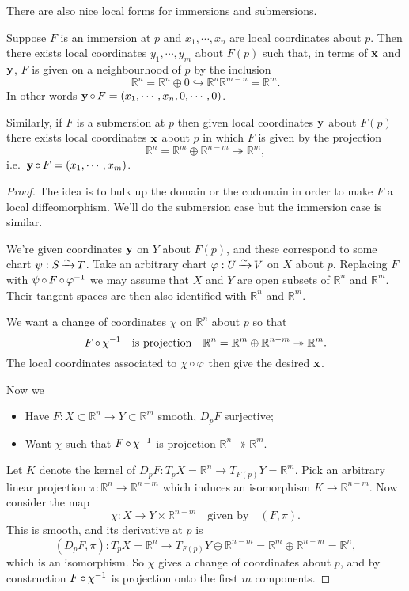 \documentclass[a4paper,11pt]{article}
\begin{document}
	There are also nice local forms for immersions and submersions.

	\begin{lem}
		Suppose $F$ is an immersion at $p$ and $x_1, \cdots, x_n$ are local coordinates about $p$. Then there exists local coordinates $y_1, \cdots, y_m$ about $F(p)$ such that, in terms of $\vb x$ and $\vb y$, $F$ is given on a neighbourhood of $p$ by the inclusion
		\[
			\mathbb{R}^n = \mathbb{R}^n \oplus 0 \hookrightarrow \mathbb{R}^n \mathbb{R}^{m-n} = \mathbb{R}^m.
		\]
		In other words $\vb y \operatorname{\circ} F = (x_1, \cdots, x_n, 0, \cdots, 0)$.

		Similarly, if $F$ is a submersion at $p$ then given local coordinates $\vb y$ about $F(p)$ there exists local coordinates $\vb x$ about $p$ in which $F$ is given by the projection
		\[
			\mathbb{R}^n = \mathbb{R}^m \oplus \mathbb{R}^{n-m} \twoheadrightarrow \mathbb{R}^m,
		\]
		i.e.\ $\vb y \operatorname{\circ} F = (x_1, \cdots, x_m)$.
	\end{lem}
	\begin{proof}
		The idea is to bulk up the domain or the codomain in order to make $F$ a local diffeomorphism. We'll do the submersion case but the immersion case is similar.

		We're given coordinates $\vb y$ on $Y$ about $F(p)$, and these correspond to some chart $\psi : S \operatorname{\xrightarrow{\sim}} T$. Take an arbitrary chart $\varphi : U \operatorname{\xrightarrow{\sim}} V$ on $X$ about $p$. Replacing $F$ with $\psi \operatorname{\circ} F \operatorname{\circ} \varphi^{-1}$ we may assume that $X$ and $Y$ are open subsets of $\mathbb{R}^n$ and $\mathbb{R}^m$. Their tangent spaces are then also identified with $\mathbb{R}^n$ and $\mathbb{R}^m$.

		We want a change of coordinates $\chi$ on $\mathbb{R}^n$ about $p$ so that
		\[
			F \operatorname{\circ} \chi^{-1} \quad \text{is projection} \quad \mathbb{R}^n = \mathbb{R}^m \oplus \mathbb{R}^{n-m} \twoheadrightarrow \mathbb{R}^m.
		\]
		The local coordinates associated to $\chi \operatorname{\circ} \varphi$ then give the desired $\vb x$.

		Now we
		\begin{itemize}
			\item Have $F : X \subset \mathbb{R}^n \to Y \subset \mathbb{R}^m$ smooth, $D_p F$ surjective;
			\item Want $\chi$ such that $F \operatorname{\circ} \chi^{-1}$ is projection $\mathbb{R}^n \twoheadrightarrow \mathbb{R}^m$.
		\end{itemize}

		Let $K$ denote the kernel of $D_p F : T_p X = \mathbb{R}^n \to T _{F(p)} Y = \mathbb{R}^m$. Pick an arbitrary linear projection $\pi : \mathbb{R}^n \to \mathbb{R}^{n-m}$ which induces an isomorphism $K \to \mathbb{R}^{n-m}$. Now consider the map
		\[
			\chi : X \to Y \times \mathbb{R}^{n-m} \quad \text{given by} \quad (F,\pi).
		\]
		This is smooth, and its derivative at $p$ is  
		\[
			(D_p F, \pi) : T_p X = \mathbb{R}^n \to T _{F(p)}Y \oplus \mathbb{R}^{n-m} = \mathbb{R}^m \oplus \mathbb{R}^{n-m} = \mathbb{R}^n,
		\]
		which is an isomorphism. So $\chi$ gives a change of coordinates about $p$, and by construction $F \operatorname{\circ} \chi^{-1}$ is projection onto the first $m$ components.
	\end{proof}
\end{document}
